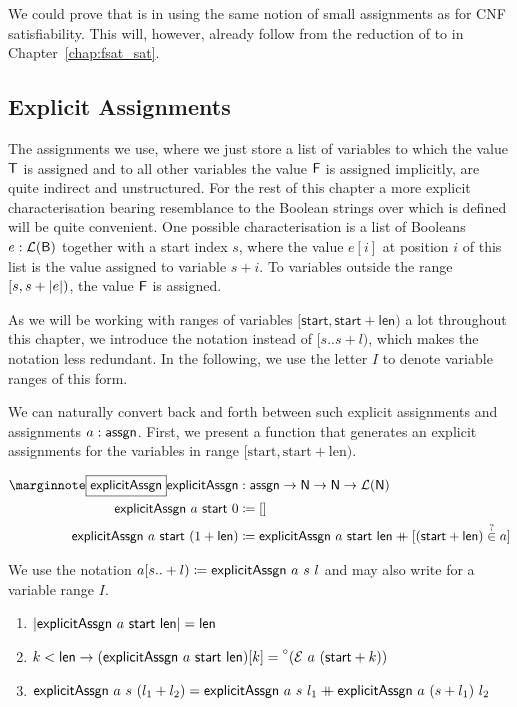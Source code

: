 We could prove that \fsat{} is in \NP{} using the same notion of small assignments as for CNF satisfiability. This will, however, already follow from the reduction of \fsat{} to \SAT{} in Chapter~\ref{chap:fsat_sat}. 

\subsection{Explicit Assignments}
The assignments we use, where we just store a list of variables to which the value $\mathsf{T}$ is assigned and to all other variables the value $\mathsf{F}$ is assigned implicitly, are quite indirect and unstructured. 
For the rest of this chapter a more explicit characterisation bearing resemblance to the Boolean strings over which \BPR{} is defined will be quite convenient.
One possible characterisation is a list of Booleans $e : \mathcal{L} (\textsf{B})$ together with a start index $s$, where the value $e[i]$ at position $i$ of this list is the value assigned to variable $s + i$. To variables outside the range $[s, s+|e|)$, the value $\mathsf{F}$ is assigned.

As we will be working with ranges of variables $[\textsf{start}, \textsf{start} + \textsf{len})$ a lot throughout this chapter, we introduce the notation \mnotec{$[s .. +l)$} instead of $[s .. s+l)$, which makes the notation less redundant. In the following, we use the letter $I$ to denote variable ranges of this form.

We can naturally convert back and forth between such explicit assignments and assignments $a : \textsf{assgn}$.
First, we present a function that generates an explicit assignments for the variables in range $[\text{start}, \text{start} + \text{len})$. 

\newcommand{\explicitA}{\textsf{explicitAssgn}}
\begin{align*}
  \mnote{\explicitA}
  \explicitA &: \assgn \rightarrow \nat \rightarrow \nat \rightarrow \listsof{\nat} \\
  \explicitA~a~\textsf{start}~0 &\defeq \nil \\
  \explicitA~a~\textsf{start}~(\natS{\textsf{len}}) &\defeq \explicitA~a~\textsf{start}~\textsf{len} \concat [(\textsf{start} + \textsf{len}) \overset{?}{\in} a]
\end{align*}

We use the notation $a[s ..+l) \defeq \explicitA~a~s~l$ and may also write  for a variable range $I$.

\begin{lemma}[Properties of \explicitA]\leavevmode
  \begin{enumerate}
    \item $\length{\explicitA~a~\textsf{start}~\textsf{len}} = \textsf{len}$
    \item $k < \textsf{len} \rightarrow (\explicitA~a~\textsf{start}~\textsf{len})[k] = \OSome{(\evalA{a}{(\textsf{start} + k)})}$
    \item $\explicitA~a~s~(l_1 + l_2) = \explicitA~a~s~l_1 \concat \explicitA~a~(s + l_1)~l_2$ 
  \end{enumerate}
\end{lemma}

